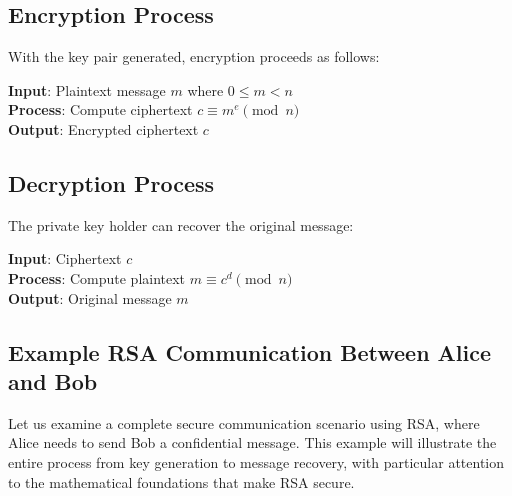 \documentclass[11pt,a4paper]{article}
\numberwithin{equation}{section}
\newenvironment{algorithmBox}[1][]
{
    \begin{tcolorbox}[
        colback=gray!10,              %
        colframe=gray!50!black,       %
        sharp corners,                %
        boxrule=0.5pt,                %
        left=5pt, right=5pt,          %
        top=5pt, bottom=5pt,          %
        title={\centering\bfseries RSA Cryptosystem}, %
        fonttitle=\small\sffamily,    %
        #1                            %
    ]
    \begin{minipage}{\linewidth}     %
}
{
    \end{minipage}
    \end{tcolorbox}
}
\begin{document}
\subsection{Encryption Process}
With the key pair generated, encryption proceeds as follows:

\begin{algorithmBox}
    \begin{center}
        \textbf{Input}: Plaintext message $m$ where $0 \leq m < n$ \\
        \textbf{Process}: Compute ciphertext $c \equiv m^e \pmod{n}$ \\
        \textbf{Output}: Encrypted ciphertext $c$
    \end{center}
\end{algorithmBox}

\newpage 

\subsection{Decryption Process}
The private key holder can recover the original message:

\begin{algorithmBox}
    \begin{center}
        \textbf{Input}: Ciphertext $c$ \\
        \textbf{Process}: Compute plaintext $m \equiv c^d \pmod{n}$ \\
        \textbf{Output}: Original message $m$
    \end{center}
\end{algorithmBox}

\subsection{Example RSA Communication Between Alice and Bob}

Let us examine a complete secure communication scenario using RSA, where Alice needs to send Bob a confidential message. This example will illustrate the entire process from key generation to message recovery, with particular attention to the mathematical foundations that make RSA secure.
\end{document}
